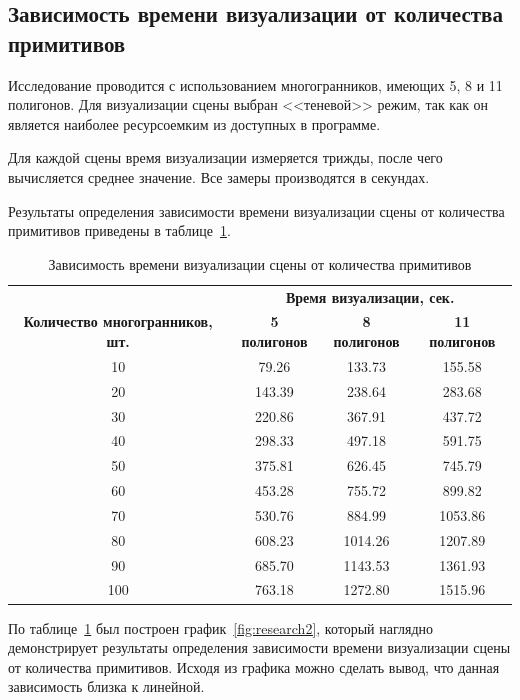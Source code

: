 \subsection{Зависимость времени визуализации от количества примитивов}

Исследование проводится с использованием многогранников, имеющих 5, 8 и 11 полигонов. Для визуализации сцены выбран <<теневой>> режим, так как он является наиболее ресурсоемким из доступных в программе.

Для каждой сцены время визуализации измеряется трижды, после чего вычисляется среднее значение. Все замеры производятся в секундах.

Результаты определения зависимости времени визуализации сцены от количества примитивов приведены в таблице~\ref{tbl:research2}.

\begin{table}[ht]
	\small
	\begin{center}
		\begin{threeparttable}
			\caption{Зависимость времени визуализации сцены от количества примитивов}
			\begin{tabular}{|c|c|c|c|}
				\hline
				& \multicolumn{3}{c|}{\bfseries Время визуализации, сек.} \\ \cline{2-4}
				\bfseries Количество многогранников, шт. & \bfseries 5 полигонов & \bfseries 8 полигонов & \bfseries 11 полигонов \\
				\hline
				10  & 79.26   & 133.73 & 155.58  \\
				20  & 143.39 & 238.64 & 283.68  \\
				30  & 220.86 & 367.91 & 437.72  \\
				40  & 298.33 & 497.18 & 591.75  \\
				50  & 375.81 & 626.45 & 745.79  \\
				60  & 453.28 & 755.72 & 899.82  \\
				70  & 530.76 & 884.99 & 1053.86 \\
				80  & 608.23 & 1014.26 & 1207.89 \\
				90  & 685.70 & 1143.53 & 1361.93 \\
				100 & 763.18 & 1272.80 & 1515.96 \\
				\hline
			\end{tabular}	
			\label{tbl:research2}
		\end{threeparttable}
	\end{center}
\end{table}

По таблице~\ref{tbl:research2} был построен график~\ref{fig:research2}, который наглядно демонстрирует результаты определения зависимости времени визуализации сцены от количества примитивов. Исходя из графика можно сделать вывод, что данная зависимость близка к линейной.

